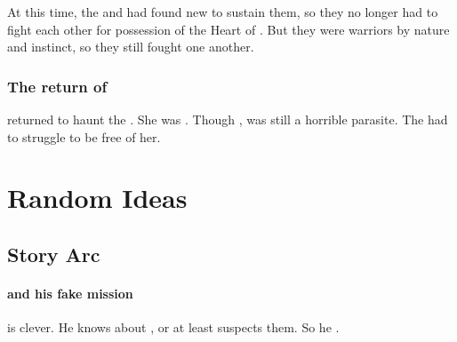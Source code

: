 At this time, the \dragons and \resphain had found new \dweomers to sustain them, so they no longer had to fight each other for possession of the Heart of \Miith. 
But they were warriors by nature and instinct, so they still fought one another. 









\subsection{The return of \Tiamat}
\Tiamat returned to haunt the \dragons. 
She was .
Though , \Tiamat was still a horrible parasite.
The \dragons had to struggle to be free of her.























\chapter{Random Ideas}












\section{\Shilred{} Story Arc}





\subsubsection[Ishnaruchaefir and his fake mission]{\Ishnaruchaefir{} and his fake mission}
\Ishnaruchaefir{} is clever. He knows about , or at least suspects them. So he . 

